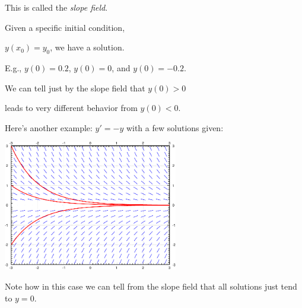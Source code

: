 \documentclass[10pt,aspectratio=169]{beamer}
\begin{document}
\begin{frame}
\vspace*{-1.3in}
\pause

This is called the \emph{slope field}.

\pause
\medskip

Given a specific initial condition,

$y(x_0)=y_0$, we have a solution.

\pause
\medskip

E.g., $y(0) = 0.2$, $y(0) = 0$, and $y(0) = -0.2$.

\vspace*{-109.5pt}
\hspace*{3in}

\pause
\vspace*{-0.33in}

We can tell just by the slope field that $y(0) > 0$

leads to very different behavior from $y(0) < 0$.

\end{frame}

\begin{frame}

Here's another example: $y'=-y$ with a few solutions given:

\begin{center}
\includegraphics[width=3in]{../figures/1-3-mysl-sol}
\end{center}

\pause

Note how in this case we can tell from the slope field
that all solutions just tend to $y=0$.
\end{frame}
\end{document}
